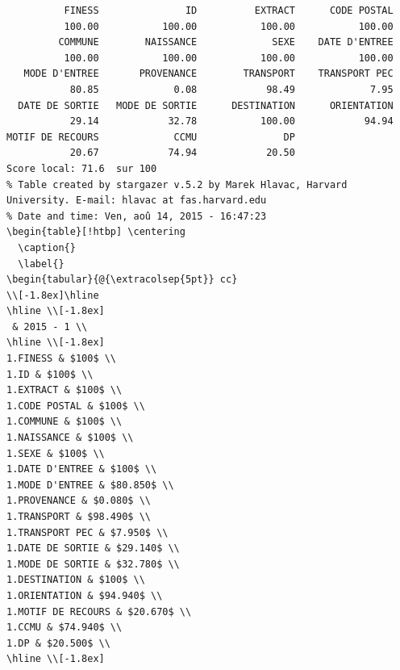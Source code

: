 \documentclass[]{article}
\begin{document}
\begin{verbatim}
          FINESS               ID          EXTRACT      CODE POSTAL 
          100.00           100.00           100.00           100.00 
         COMMUNE        NAISSANCE             SEXE    DATE D'ENTREE 
          100.00           100.00           100.00           100.00 
   MODE D'ENTREE       PROVENANCE        TRANSPORT    TRANSPORT PEC 
           80.85             0.08            98.49             7.95 
  DATE DE SORTIE   MODE DE SORTIE      DESTINATION      ORIENTATION 
           29.14            32.78           100.00            94.94 
MOTIF DE RECOURS             CCMU               DP 
           20.67            74.94            20.50 
Score local: 71.6  sur 100
% Table created by stargazer v.5.2 by Marek Hlavac, Harvard University. E-mail: hlavac at fas.harvard.edu
% Date and time: Ven, aoû 14, 2015 - 16:47:23
\begin{table}[!htbp] \centering 
  \caption{} 
  \label{} 
\begin{tabular}{@{\extracolsep{5pt}} cc} 
\\[-1.8ex]\hline 
\hline \\[-1.8ex] 
 & 2015 - 1 \\ 
\hline \\[-1.8ex] 
1.FINESS & $100$ \\ 
1.ID & $100$ \\ 
1.EXTRACT & $100$ \\ 
1.CODE POSTAL & $100$ \\ 
1.COMMUNE & $100$ \\ 
1.NAISSANCE & $100$ \\ 
1.SEXE & $100$ \\ 
1.DATE D'ENTREE & $100$ \\ 
1.MODE D'ENTREE & $80.850$ \\ 
1.PROVENANCE & $0.080$ \\ 
1.TRANSPORT & $98.490$ \\ 
1.TRANSPORT PEC & $7.950$ \\ 
1.DATE DE SORTIE & $29.140$ \\ 
1.MODE DE SORTIE & $32.780$ \\ 
1.DESTINATION & $100$ \\ 
1.ORIENTATION & $94.940$ \\ 
1.MOTIF DE RECOURS & $20.670$ \\ 
1.CCMU & $74.940$ \\ 
1.DP & $20.500$ \\ 
\hline \\[-1.8ex] 

\end{verbatim}
\end{document}
